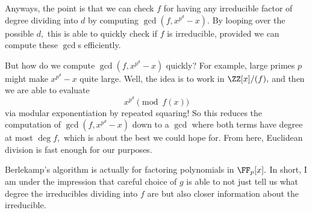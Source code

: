 Anyways, the point is that we can check $f$ for having any irreducible factor of degree dividing into $d$ by computing $\gcd\left(f,x^{p^d}-x\right).$ By looping over the possible $d,$ this is able to quickly check if $f$ is irreducible, provided we can compute these $\gcd$s efficiently.

But how do we compute $\gcd\left(f,x^{p^d}-x\right)$ quickly? For example, large primes $p$ might make $x^{p^d}-x$ quite large. Well, the idea is to work in $\ZZ[x]/(f),$ and then we are able to evaluate
\[x^{p^d}\pmod{f(x)}\]
via modular exponentiation by repeated squaring! So this reduces the computation of $\gcd\left(f,x^{p^d}-x\right)$ down to a $\gcd$ where both terms have degree at most $\deg f,$ which is about the best we could hope for. From here, Euclidean division is fast enough for our purposes.
\begin{remark}[Nir]
	Berlekamp's algorithm is actually for factoring polynomials in $\FF_p[x].$ In short, I am under the impression that careful choice of $g$ is able to not just tell us what degree the irreducibles dividing into $f$ are but also closer information about the irreducible.
\end{remark}